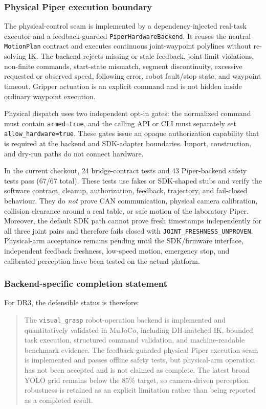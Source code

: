 \subsubsection{Physical Piper execution boundary}

The physical-control seam is implemented by a dependency-injected real-task
executor and a feedback-guarded \texttt{PiperHardwareBackend}. It reuses the neutral
\texttt{MotionPlan} contract and executes continuous joint-waypoint
polylines without re-solving IK. The backend rejects missing or stale
feedback, joint-limit violations, non-finite commands, start-state mismatch,
segment discontinuity, excessive requested or observed speed, following
error, robot fault/stop state, and waypoint timeout. Gripper actuation is an
explicit command and is not hidden inside ordinary waypoint execution.

Physical dispatch uses two independent opt-in gates: the normalized command
must contain \texttt{armed=true}, and the calling API or CLI must separately
set \texttt{allow\_hardware=true}. These gates issue an opaque authorization
capability that is required at the backend and SDK-adapter boundaries. Import,
construction, and dry-run paths do not connect hardware.

In the current checkout, 24 bridge-contract tests and 43 Piper-backend safety
tests pass (67/67 total). These tests use fakes or SDK-shaped stubs and verify
the software contract, cleanup, authorization, feedback, trajectory, and
fail-closed behaviour. They do \emph{not} prove CAN communication, physical
camera calibration, collision clearance around a real table, or safe motion
of the laboratory Piper. Moreover, the default SDK path cannot prove fresh
timestamps independently for all three joint pairs and therefore fails closed
with \texttt{JOINT\_FRESHNESS\_UNPROVEN}. Physical-arm acceptance remains
pending until the SDK/firmware interface, independent feedback freshness,
low-speed motion, emergency stop, and calibrated perception have been tested
on the actual platform.

\subsubsection{Backend-specific completion statement}

For DR3, the defensible status is therefore:

\begin{quote}
The \texttt{visual\_grasp} robot-operation backend is implemented and
quantitatively validated in MuJoCo, including DH-matched IK, bounded task
execution, structured command validation, and machine-readable benchmark
evidence. The feedback-guarded physical Piper execution seam is implemented
and passes offline safety tests, but physical-arm operation has not been
accepted and is not claimed as complete. The latest broad YOLO grid remains
below the 85\% target, so camera-driven perception robustness is retained as
an explicit limitation rather than being reported as a completed result.
\end{quote}
